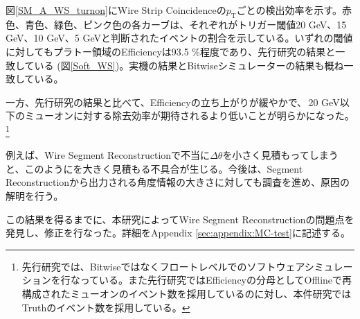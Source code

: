 図\ref{SM_A_WS_turnon}にWire Strip Coincidenceの$p_\mathrm{T}$ごとの検出効率を示す。赤色、青色、緑色、ピンク色の各カーブは、それぞれがトリガー閾値20 GeV、15 GeV、10 GeV、5 GeVと判断されたイベントの割合を示している。いずれの\pt 閾値に対してもプラトー領域のEfficiencyは93.5 \%程度であり、先行研究\cite{mt_kawamoto}の結果と一致している (図\ref{Soft_WS})。実機の結果とBitwiseシミュレーターの結果も概ね一致している。

一方、先行研究の結果と比べて、Efficiencyの立ち上がりが緩やかで、\pt $\,$20 GeV以下のミューオンに対する除去効率が期待されるより低いことが明らかになった。\footnote{先行研究では、Bitwiseではなくフロートレベルでのソフトウェアシミュレーションを行なっている。また先行研究ではEfficiencyの分母としてOfflineで再構成されたミューオンのイベント数を採用しているのに対し、本件研究ではTruthのイベント数を採用している。}

例えば、Wire Segment Reconstructionで不当に$\Delta\theta$を小さく見積もってしまうと、このように\pt を大きく見積もる不具合が生じる。今後は、Segment Reconstructionから出力される角度情報の大きさに対しても調査を進め、原因の解明を行う。

この結果を得るまでに、本研究によってWire Segment Reconstructionの問題点を発見し、修正を行なった。詳細をAppendix \ref{sec:appendix:MC-test}に記述する。

